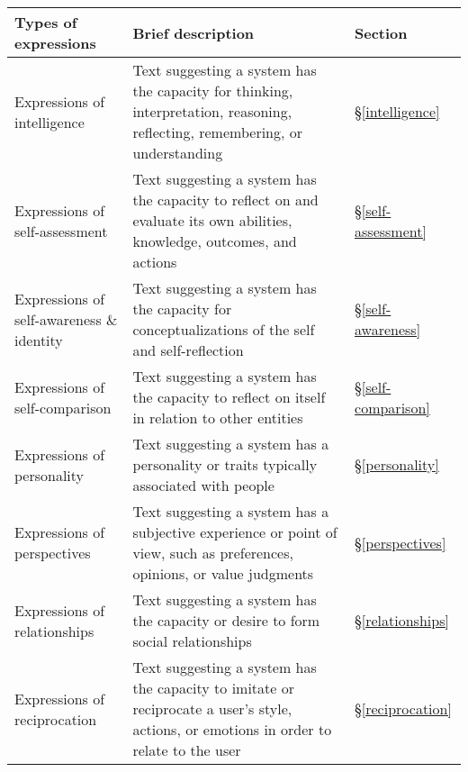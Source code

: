 \begin{table*}[ht]
    \scriptsize
    \def\arraystretch{1.25}
    \setlength{\tabcolsep}{0.6em}
    \centering
    \begin{tabular}{@{}p{4.1cm}|p{12.5cm}p{0.6cm}} 
    {\bf Types of expressions} & {\bf Brief description} & Section \\ \toprule
    
    Expressions of intelligence 
    & Text suggesting a system has the capacity for thinking, interpretation, reasoning, reflecting, remembering, or understanding
    & \S\ref{intelligence}
    \\ \hline
    
    Expressions of self-assessment 
    & Text suggesting a system has the capacity to reflect on and evaluate its own abilities, knowledge, outcomes, and actions
    & \S\ref{self-assessment}
    \\ \hline

    Expressions of self-awareness \& identity 
    & Text suggesting a system has the capacity for conceptualizations of the self and self-reflection
    & \S\ref{self-awareness}
    \\ \hline

    Expressions of self-comparison
    & Text suggesting a system has the capacity to reflect on itself in relation to other entities
    & \S\ref{self-comparison}
    \\ \hline

    Expressions of personality
    & Text suggesting a system has a personality or traits typically associated with people
    & \S\ref{personality}
    \\ \hline

    Expressions of perspectives 
    & Text suggesting a system has a subjective experience or point of view, such as preferences, opinions, or value judgments 
    & \S\ref{perspectives}
    \\ \hline

    Expressions of relationships 
    & Text suggesting a system has the capacity or desire to form social relationships
    & \S\ref{relationships}
    \\ \hline

    Expressions of reciprocation
    & Text suggesting a system has the capacity to imitate or reciprocate a user's style, actions, or emotions in order to relate to the user
    & \S\ref{reciprocation}
    \\ \hline


\end{tabular}
\end{table*}
